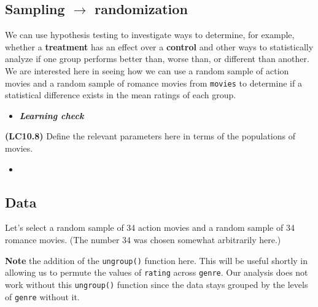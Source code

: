 \documentclass[12pt,]{krantz}
\makeatletter
\newenvironment{Shaded}{\begin{snugshade}}{\end{snugshade}}
\newcommand{\KeywordTok}[1]{\textcolor[rgb]{0.27,0.27,0.27}{\textbf{#1}}}
\newcommand{\DecValTok}[1]{\textcolor[rgb]{0.06,0.06,0.06}{#1}}
\newcommand{\StringTok}[1]{\textcolor[rgb]{0.5,0.5,0.5}{#1}}
\newcommand{\OperatorTok}[1]{\textcolor[rgb]{0.43,0.43,0.43}{\textbf{#1}}}
\newcommand{\NormalTok}[1]{#1}
\newenvironment{kframe}{%
\medskip{}
\setlength{\fboxsep}{.8em}
 \def\at@end@of@kframe{}%
 \ifinner\ifhmode%
  \def\at@end@of@kframe{\end{minipage}}%
  \begin{minipage}{\columnwidth}%
 \fi\fi%
 \def\FrameCommand##1{\hskip\@totalleftmargin \hskip-\fboxsep
 \colorbox{shadecolor}{##1}\hskip-\fboxsep
     \hskip-\linewidth \hskip-\@totalleftmargin \hskip\columnwidth}%
 \MakeFramed {\advance\hsize-\width
   \@totalleftmargin\z@ \linewidth\hsize
   \@setminipage}}%
 {\par\unskip\endMakeFramed%
 \at@end@of@kframe}
\renewenvironment{Shaded}{\begin{kframe}}{\end{kframe}}
\newenvironment{rmdblock}[1]
  {\begin{shaded*}
  \begin{itemize}
  \renewcommand{\labelitemi}{
    \raisebox{-.7\height}[0pt][0pt]{
    }
  }
  \item
  }
  {
  \end{itemize}
  \end{shaded*}
  }
\newenvironment{learncheck}
  {\begin{rmdblock}{warning}}
  {\end{rmdblock}}
\makeatother
\begin{document}
\subsection{\texorpdfstring{Sampling \(\rightarrow\)
randomization}{Sampling \textbackslash{}rightarrow randomization}}\label{sampling-rightarrow-randomization}

We can use hypothesis testing to investigate ways to determine, for
example, whether a \textbf{treatment} has an effect over a
\textbf{control} and other ways to statistically analyze if one group
performs better than, worse than, or different than another. We are
interested here in seeing how we can use a random sample of action
movies and a random sample of romance movies from \texttt{movies} to
determine if a statistical difference exists in the mean ratings of each
group.

\begin{learncheck}
\textbf{\emph{Learning check}}
\end{learncheck}

\textbf{(LC10.8)} Define the relevant parameters here in terms of the
populations of movies.

\begin{learncheck}

\end{learncheck}

\subsection{Data}\label{data}

Let's select a random sample of 34 action movies and a random sample of
34 romance movies. (The number 34 was chosen somewhat arbitrarily here.)

\begin{Shaded}
\end{Shaded}

\textbf{Note} the addition of the \texttt{ungroup()} function here. This
will be useful shortly in allowing us to permute the values of
\texttt{rating} across \texttt{genre}. Our analysis does not work
without this \texttt{ungroup()} function since the data stays grouped by
the levels of \texttt{genre} without it.
\end{document}
